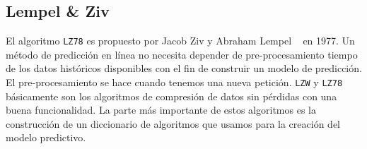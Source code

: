  
\subsection{Lempel \& Ziv }


El algoritmo \texttt{LZ78} es propuesto por Jacob Ziv y Abraham Lempel ~\cite{ZivLempel1977} en 1977. Un método de predicción en línea no necesita depender de pre-procesamiento tiempo de los datos históricos disponibles con el fin de construir un modelo de predicción. El pre-procesamiento se hace cuando tenemos una nueva petición. \texttt{LZW} y \texttt{LZ78} básicamente son los algoritmos de compresión de datos sin pérdidas con una buena funcionalidad. La parte más importante de estos algoritmos es la construcción de un diccionario de algoritmos que usamos para la creación del modelo predictivo. 










